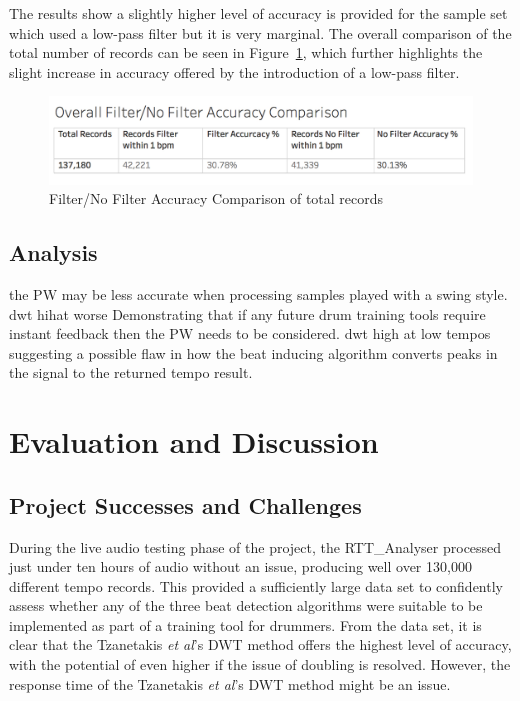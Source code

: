 \documentclass[a4paper, 11pt]{article}
\begin{document}
The results show a slightly higher level of accuracy is provided for the sample set which used a low-pass filter but it is very marginal. The overall comparison of the total number of records can be seen in Figure~\ref{fig: overFilAcc}, which further highlights the slight increase in accuracy offered by the introduction of a low-pass filter. 

\begin{figure}[htbp]
\centering
\vspace{-1in}
\includegraphics[scale=0.3]{images/OverFilAc.jpg}
\caption{Filter/No Filter Accuracy Comparison of total records}
\label{fig: overFilAcc}
\end{figure}


\subsection{Analysis}
the PW may be less accurate when processing samples played with a swing style.
dwt hihat worse
Demonstrating that if any future drum training tools require instant feedback then the PW needs to be considered.
dwt high  at low tempos
suggesting a possible flaw in how the beat inducing algorithm converts peaks in the signal to the returned tempo result.

\clearpage
\maketitle \section{Evaluation and Discussion}

\subsection{Project Successes and Challenges}

During the live audio testing phase of the project, the RTT\_Analyser processed just under ten hours of audio without an issue, producing well over 130,000 different tempo records. This provided a sufficiently large data set to confidently assess whether any of the three beat detection algorithms were suitable to be implemented as part of a training tool for drummers. From the data set, it is clear that the Tzanetakis \textit{et al}'s \cite{tzane1} DWT method offers the highest level of accuracy, with the potential of even higher if the issue of doubling is resolved. However, the response time of the Tzanetakis \textit{et al}'s \cite{tzane1} DWT method might be an issue.\par 
\end{document}

